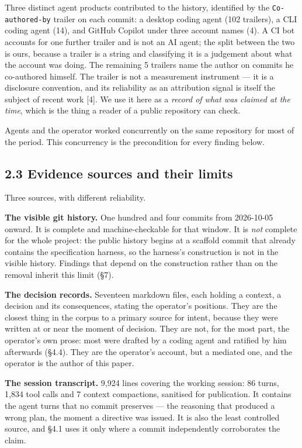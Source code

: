 \documentclass[11pt,a4paper]{article}
\begin{document}
Three distinct agent products contributed to the history, identified by the \texttt{Co-authored-by} trailer on each commit: a desktop coding agent (102 trailers), a CLI coding agent (14), and GitHub Copilot under three account names (4). A CI bot accounts for one further trailer and is not an AI agent; the split between the two is ours, because a trailer is a string and classifying it is a judgement about what the account was doing. The remaining 5 trailers name the author on commits he co-authored himself. The trailer is not a measurement instrument --- it is a disclosure convention, and its reliability as an attribution signal is itself the subject of recent work [4]. We use it here as a \emph{record of what was claimed at the time}, which is the thing a reader of a public repository can check.

Agents and the operator worked concurrently on the same repository for most of the period. This concurrency is the precondition for every finding below.

\subsection*{2.3 Evidence sources and their limits}

Three sources, with different reliability.

\textbf{The visible git history.} One hundred and four commits from 2026-10-05 onward. It is complete and machine-checkable for that window. It is \emph{not} complete for the whole project: the public history begins at a scaffold commit that already contains the specification harness, so the harness's construction is not in the visible history. Findings that depend on the construction rather than on the removal inherit this limit (\S{}7).

\textbf{The decision records.} Seventeen markdown files, each holding a context, a decision and its consequences, stating the operator's positions. They are the closest thing in the corpus to a primary source for intent, because they were written at or near the moment of decision. They are not, for the most part, the operator's own prose: most were drafted by a coding agent and ratified by him afterwards (\S{}4.4). They are the operator's account, but a mediated one, and the operator is the author of this paper.

\textbf{The session transcript.} 9,924 lines covering the working session: 86 turns, 1,834 tool calls and 7 context compactions, sanitised for publication. It contains the agent turns that no commit preserves --- the reasoning that produced a wrong plan, the moment a directive was issued. It is also the least controlled source, and \S{}4.1 uses it only where a commit independently corroborates the claim.
\end{document}
